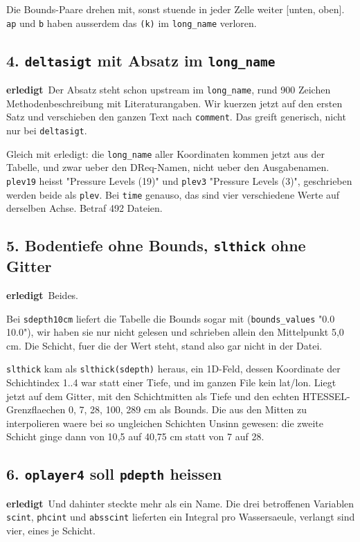 \documentclass[11pt,a4paper]{article}
\newcommand{\code}[1]{\texttt{\small #1}}
\newcommand{\ok}{\textcolor{green!45!black}{\textbf{erledigt}}}
\begin{document}
Die Bounds-Paare drehen mit, sonst stuende in jeder Zelle weiter [unten, oben].
\code{ap} und \code{b} haben ausserdem das \code{(k)} im \code{long\_name} verloren.

\subsection*{4. \code{deltasigt} mit Absatz im \code{long\_name}}
\ok\ Der Absatz steht schon upstream im \code{long\_name}, rund 900 Zeichen
Methodenbeschreibung mit Literaturangaben. Wir kuerzen jetzt auf den ersten Satz und
verschieben den ganzen Text nach \code{comment}. Das greift generisch, nicht nur bei
\code{deltasigt}.

Gleich mit erledigt: die \code{long\_name} aller Koordinaten kommen jetzt aus der
Tabelle, und zwar ueber den DReq-Namen, nicht ueber den Ausgabenamen. \code{plev19}
heisst "Pressure Levels (19)" und \code{plev3} "Pressure Levels (3)", geschrieben
werden beide als \code{plev}. Bei \code{time} genauso, das sind vier verschiedene
Werte auf derselben Achse. Betraf 492 Dateien.

\subsection*{5. Bodentiefe ohne Bounds, \code{slthick} ohne Gitter}
\ok\ Beides.

Bei \code{sdepth10cm} liefert die Tabelle die Bounds sogar mit
(\code{bounds\_values} "0.0 10.0"), wir haben sie nur nicht gelesen und schrieben
allein den Mittelpunkt 5{,}0 cm. Die Schicht, fuer die der Wert steht, stand also gar
nicht in der Datei.

\code{slthick} kam als \code{slthick(sdepth)} heraus, ein 1D-Feld, dessen Koordinate
der Schichtindex 1..4 war statt einer Tiefe, und im ganzen File kein lat/lon. Liegt
jetzt auf dem Gitter, mit den Schichtmitten als Tiefe und den echten
HTESSEL-Grenzflaechen 0, 7, 28, 100, 289 cm als Bounds. Die aus den Mitten zu
interpolieren waere bei so ungleichen Schichten Unsinn gewesen: die zweite Schicht
ginge dann von 10{,}5 auf 40{,}75 cm statt von 7 auf 28.

\subsection*{6. \code{oplayer4} soll \code{pdepth} heissen}
\ok\ Und dahinter steckte mehr als ein Name. Die drei betroffenen Variablen
\code{scint}, \code{phcint} und \code{absscint} lieferten ein Integral pro
Wassersaeule, verlangt sind vier, eines je Schicht.
\end{document}
